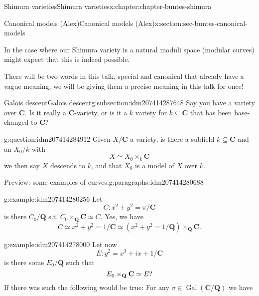 \documentclass[oneside,10pt,]{book}
\numberwithin{equation}{section}
\newcommand{\QQ}{\mathbf{Q}}
\newcommand{\CC}{\mathbf{C}}
\newcommand{\Gal}[2]{\operatorname{Gal}(#1/#2)}
\begin{document}
\begin{chapterptx}{Shimura varieties}{}{Shimura varieties}{}{}{x:chapter:chapter-buntes-shimura}
\begin{sectionptx}{Canonical models (Alex)}{}{Canonical models (Alex)}{}{}{x:section:sec-buntes-canonical-models}
\begin{introduction}{}
\par
In the case where our Shimura variety is a natural moduli space (modular curves) might expect that this is indeed possible.%
\par
There will be two words in this talk, special and canonical that already have a vague meaning, we will be giving them a precise meaning in this talk for once!%
\end{introduction}%
%
%
\typeout{************************************************}
\typeout{************************************************}
%
\begin{subsectionptx}{Galois descent}{}{Galois descent}{}{}{g:subsection:idm207414287648}
Say you have a variety over \(\CC\). Is it really a \(\CC\)-variety, or is it a \(k\) variety for \(k \subseteq \CC\) that has been base-changed to \(\CC\)?%
\begin{question}{}{g:question:idm207414284912}%
Given \(X/\CC\) a variety, is there a subfield \(k \subseteq \CC\) and an \(X_0/k\) with%
\begin{equation*}
X \simeq X_0 \times_k \CC
\end{equation*}
we then say \(X\) descends to \(k\), and that \(X_0\) is a model of \(X\) over \(k\).%
\end{question}
\begin{paragraphs}{Preview: some examples of curves.}{g:paragraphs:idm207414280688}%
\begin{example}{}{g:example:idm207414280256}%
Let%
\begin{equation*}
C \colon x^2+ y^2 = \pi/\CC
\end{equation*}
is there \(C_0/\QQ\) s.t. \(C_0\times_\QQ \CC \simeq C\). Yes, we have%
\begin{equation*}
C \simeq x^2 + y^2 = 1/\CC \simeq (x^2 + y^2 = 1/\QQ )\times_{\QQ} \CC\text{.}
\end{equation*}
%
\end{example}
\begin{example}{}{g:example:idm207414278000}%
Let now%
\begin{equation*}
E \colon y^2 = x^3 + ix + 1/\CC
\end{equation*}
is there some \(E_0/\QQ\) such that%
\begin{equation*}
E_0\times_{\QQ} \CC  \simeq E\text ?
\end{equation*}
If there was such the following would be true: For any \(\sigma\in \Gal{\CC}{\QQ}\) we have%
\begin{equation*}

\end{equation*}
\end{example}
\end{paragraphs}
\end{subsectionptx}
\end{sectionptx}
\end{chapterptx}
\end{document}
